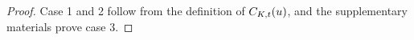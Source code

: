 \documentclass{article}
\begin{document}
\begin{proof}
  Case 1 and 2 follow from the definition of $C_{K,t}(u)$, and the
  supplementary materials prove case 3.



\end{proof}
\end{document}
